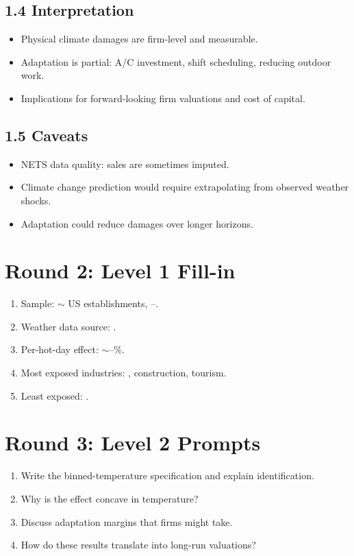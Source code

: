 \documentclass[11pt]{article}
\newcommand{\blank}[1]{\underline{\hspace{#1}}}
\begin{document}
\subsection*{1.4 Interpretation}
\begin{itemize}
\item Physical climate damages are firm-level and measurable.
\item Adaptation is partial: A/C investment, shift scheduling, reducing outdoor work.
\item Implications for forward-looking firm valuations and cost of capital.
\end{itemize}

\subsection*{1.5 Caveats}
\begin{alertbox}
\begin{itemize}
\item NETS data quality: sales are sometimes imputed.
\item Climate change prediction would require extrapolating from observed weather shocks.
\item Adaptation could reduce damages over longer horizons.
\end{itemize}
\end{alertbox}

\section*{Round 2: Level 1 Fill-in}
\begin{enumerate}
\item Sample: $\sim$\blank{2cm} US establishments, \blank{1cm}--\blank{1cm}.
\item Weather data source: \blank{1.5cm}.
\item Per-hot-day effect: $\sim$\blank{1cm}--\blank{1cm}\%.
\item Most exposed industries: \blank{2cm}, construction, tourism.
\item Least exposed: \blank{1cm}.
\end{enumerate}

\section*{Round 3: Level 2 Prompts}
\begin{enumerate}
\item Write the binned-temperature specification and explain identification.
\item Why is the effect concave in temperature?
\item Discuss adaptation margins that firms might take.
\item How do these results translate into long-run valuations?
\end{enumerate}
\end{document}
